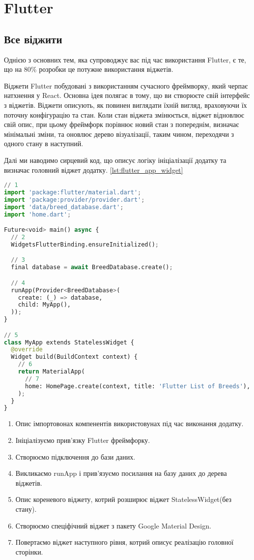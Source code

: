 \chapter{Flutter}
\label{ch3}


\section{Все віджити}
\label{section.3.1}
Однією з основних тем, яка супроводжує вас під час використання Flutter, є те, що на 80\% розробки це потужне використання віджетів.

Віджети Flutter побудовані з використанням сучасного фреймворку, який черпає натхнення у React.
Основна ідея полягає в тому, що ви створюєте свій інтерфейс з віджетів.
Віджети описують, як повинен виглядати їхній вигляд, враховуючи їх поточну конфігурацію та стан.
Коли стан віджета змінюється, віджет відновлює свій опис, при цьому фреймфорк порівнює новий стан з попереднім,
визначає мінімальні зміни, та оновлює дерево візуалізації, таким чином, переходячи з одного стану в наступний.

Далі ми наводимо сирцевий код, що описує логіку ініціалізації додатку та визначає головний віджет додатку. \ref{lst:flutter_app_widget}

\begin{lstlisting}[style=light, language=Python,label={lst:flutter_app_widget},caption=Flutter StatelessWidget]
// 1
import 'package:flutter/material.dart';
import 'package:provider/provider.dart';
import 'data/breed_database.dart';
import 'home.dart';

Future<void> main() async {
  // 2
  WidgetsFlutterBinding.ensureInitialized();

  // 3
  final database = await BreedDatabase.create();

  // 4
  runApp(Provider<BreedDatabase>(
    create: (_) => database,
    child: MyApp(),
  ));
}

// 5
class MyApp extends StatelessWidget {
  @override
  Widget build(BuildContext context) {
    // 6
    return MaterialApp(
      // 7
      home: HomePage.create(context, title: 'Flutter List of Breeds'),
    );
  }
}
\end{lstlisting}

\begin{enumerate}
    \item Опис імпортовонах компенентів використовунах під час виконання додатку.
    \item Ініціалізуємо прив'язку Flutter фреймфорку.
    \item Створюємо підключення до бази даних.
    \item Викликаємо runApp і прив'язуємо посилання на базу даних до дерева віджетів.
    \item Опис кореневого віджету, котрий розширює віджет StatelessWidget(без стану).
    \item Створюємо спеціфічний віджет з пакету Google Material Design.
    \item Повертаємо віджет наступного рівня, котрий описує реалізацію головної сторінки.
\end{enumerate}


